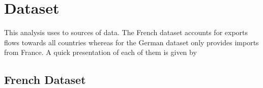 \documentclass[12pt,a4paper,titlepage,english]{article}
\begin{document}

\section{Dataset}

This analysis uses to sources of data. The French dataset accounts for exports flows towards all countries whereas for the German dataset only provides imports from France. A quick presentation of each of them is given by \cite{charles_france_2015, weber_hamburg_2015}

\subsection{French Dataset}
\end{document}
